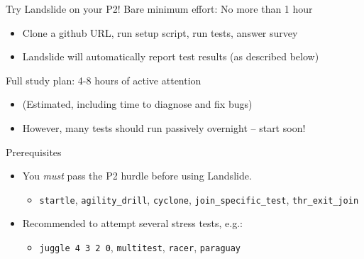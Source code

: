 \documentclass[xcolor=dvipsnames]{beamer}
\begin{document}
\begin{frame}{Try Landslide on your P2!}
	Bare minimum effort: No more than 1 hour
	\begin{itemize}
		\item Clone a github URL, run setup script, run tests, answer survey
		\item Landslide will automatically report test results (as described below)
	\end{itemize}
	\linegap

	Full study plan: 4-8 hours of active attention
	\begin{itemize}
		\item (Estimated, including time to diagnose and fix bugs)
		\item However, many tests should run passively overnight -- start soon!
	\end{itemize}
	\pause
	\linegap

	Prerequisites
	\begin{itemize}
		\item You {\em must} pass the P2 hurdle before using Landslide.
		\begin{itemize}
			\item {\tt startle}, {\tt agility\_drill}, {\tt cyclone}, {\tt join\_specific\_test}, {\tt thr\_exit\_join}
		\end{itemize}
		\item Recommended to attempt several stress tests, e.g.:
		\begin{itemize}
			\item {\tt juggle 4 3 2 0}, {\tt multitest}, {\tt racer}, {\tt paraguay}
		\end{itemize}

	\end{itemize}
\end{frame}
\end{document}
